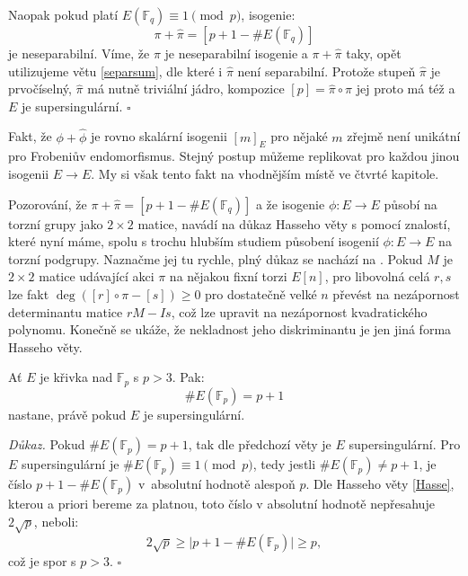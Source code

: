 \documentclass[12pt]{report}
\begin{document}
Naopak pokud platí $E(\mathbb{F}_q) \equiv 1 \pmod{p}$, isogenie: $$\pi+\widehat{\pi} = [p+1-\#E(\mathbb{F}_q)]$$ je neseparabilní. Víme, že $\pi$ je neseparabilní isogenie a $\pi+\widehat{\pi}$ taky, opět utilizujeme větu \ref{separsum}, dle které i $\widehat{\pi}$ není separabilní. Protože stupeň $\widehat{\pi}$ je prvočíselný, $\widehat{\pi}$ má nutně triviální jádro, kompozice $[p] = \widehat{\pi} \circ \pi$ jej proto má též a $E$ je supersingulární. \hfill $\square$\\

\begin{poznamka}
Fakt, že $\phi+\widehat{\phi}$ je rovno skalární isogenii $[m]_E$ pro nějaké $m$ zřejmě není unikátní pro Frobeniův endomorfismus. Stejný postup můžeme replikovat pro každou jinou isogenii $E \longrightarrow E$. My si však tento fakt  na vhodnějším místě ve čtvrté kapitole. 
\end{poznamka}

\begin{poznamka}
Pozorování, že $\pi+\widehat{\pi} = [p+1-\#E(\mathbb{F}_q)]$ a že isogenie $\phi : E \longrightarrow E$ působí na torzní grupy jako $2 \times 2$ matice, navádí na důkaz Hasseho věty s pomocí znalostí, které nyní máme, spolu s trochu hlubším studiem působení isogenií $\phi : E \longrightarrow E$ na torzní podgrupy. Naznačme jej tu rychle, plný důkaz se nachází na \cite[Thm. 8.1, Thm. 7.17]{Sutherland}. Pokud $M$ je $2 \times 2$ matice udávající akci $\pi$ na nějakou fixní torzi $E[n]$, pro libovolná celá $r,s$ lze fakt $\deg ([r] \circ \pi -[s]) \geqslant 0$ pro dostatečně velké $n$ převést na nezápornost determinantu matice $r M - I s$, což lze upravit na nezápornost kvadratického polynomu. Konečně se ukáže, že nekladnost jeho diskriminantu je jen jiná forma Hasseho věty.
\end{poznamka}

\begin{dusledek}\label{super2}
Ať $E$ je křivka nad $\mathbb{F}_p$ s $p > 3$. Pak: $$\# E(\mathbb{F}_p) = p+1$$  nastane, právě pokud $E$ je supersingulární.
\end{dusledek}

\noindent \textit{Důkaz.} Pokud $\# E(\mathbb{F}_p) = p+1$, tak dle předchozí věty je $E$ supersingulární. Pro $E$ supersingulární je $\# E(\mathbb{F}_p) \equiv 1 \pmod{p}$, tedy jestli $\# E(\mathbb{F}_p) \neq p+1$, je číslo $p+1 - \# E(\mathbb{F}_p)$ v~absolutní hodnotě alespoň $p$. Dle Hasseho věty \ref{Hasse}, kterou a priori bereme za platnou, toto číslo v absolutní hodnotě nepřesahuje $2\sqrt{p}$, neboli:
\begin{equation*}
2\sqrt{p} \geqslant \vert p+1 - \# E(\mathbb{F}_p)\vert \geqslant p,
\end{equation*}
což je spor s $p > 3$. \hfill $\square$\\
\end{document}
